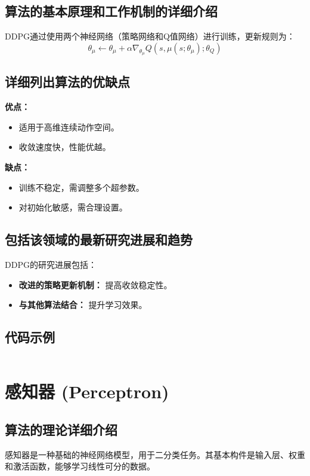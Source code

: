 \subsection*{算法的基本原理和工作机制的详细介绍}
DDPG通过使用两个神经网络（策略网络和Q值网络）进行训练，更新规则为：
\[
    \theta_\mu \leftarrow \theta_\mu + \alpha \nabla_{\theta_\mu} Q(s, \mu(s; \theta_\mu); \theta_Q)
\]

\subsection*{详细列出算法的优缺点}
\textbf{优点：}
\begin{itemize}
    \item 适用于高维连续动作空间。
    \item 收敛速度快，性能优越。
\end{itemize}

\textbf{缺点：}
\begin{itemize}
    \item 训练不稳定，需调整多个超参数。
    \item 对初始化敏感，需合理设置。
\end{itemize}

\subsection*{包括该领域的最新研究进展和趋势}
DDPG的研究进展包括：
\begin{itemize}
    \item \textbf{改进的策略更新机制：} 提高收敛稳定性。
    \item \textbf{与其他算法结合：} 提升学习效果。
\end{itemize}
\subsection*{代码示例}
\begin{lstlisting}

\end{lstlisting}


\section{感知器 (Perceptron)}
\subsection*{算法的理论详细介绍}
感知器是一种基础的神经网络模型，用于二分类任务。其基本构件是输入层、权重和激活函数，能够学习线性可分的数据。

